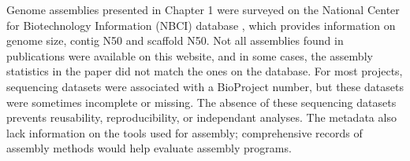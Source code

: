 Genome assemblies presented in Chapter 1 were surveyed on the National Center for Biotechnology Information (NBCI) database \cite{ncbi}, which provides information on genome size, contig N50 and scaffold N50. Not all assemblies found in publications were available on this website, and in some cases, the assembly statistics in the paper did not match the ones on the database. For most projects, sequencing datasets were associated with a BioProject number, but these datasets were sometimes incomplete or missing. The absence of these sequencing datasets prevents reusability, reproducibility, or independant analyses. The metadata also lack information on the tools used for assembly; comprehensive records of assembly methods would help evaluate assembly programs. \\
